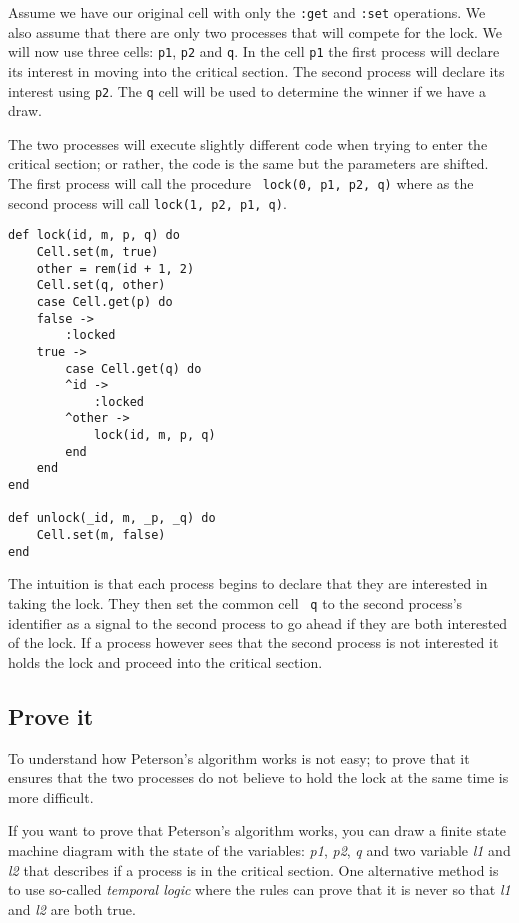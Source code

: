 \documentclass[a4paper,11pt]{article}
\begin{document}
Assume we have our original cell with only the {\tt :get} and {\tt :set}
operations. We also assume that there are only two processes that will
compete for the lock. We will now use three cells: {\tt p1}, {\tt p2}
and {\tt q}. In the cell {\tt p1} the first process will declare its
interest in moving into the critical section. The second process will
declare its interest using {\tt p2}. The {\tt q} cell will be used to
determine the winner if we have a draw.

The two processes will execute slightly different code when trying to
enter the critical section; or rather, the code is the same but the
parameters are shifted. The first process will call the procedure {\tt
    lock(0, p1, p2, q)} where as the second process will call {\tt lock(1, p2, p1, q)}.

\pagebreak

\begin{verbatim}
def lock(id, m, p, q) do
    Cell.set(m, true)
    other = rem(id + 1, 2)
    Cell.set(q, other)
    case Cell.get(p) do
    false ->
        :locked
    true -> 
        case Cell.get(q) do
        ^id ->
            :locked
        ^other ->
            lock(id, m, p, q)            
        end
    end
end

def unlock(_id, m, _p, _q) do
    Cell.set(m, false)
end
\end{verbatim}

The intuition is that each process begins to declare that they are
interested in taking the lock. They then set the common cell {\tt
    q} to the second process's identifier as a signal to the second
process to go ahead if they are both interested of the lock. If a
process however sees that the second process is not interested it
holds the lock and proceed into the critical section.


\subsection{Prove it}

To understand how Peterson's algorithm works is not easy; to prove
that it ensures that the two processes do not believe to hold the
lock at the same time is more difficult. 
    
If you want to prove that Peterson's algorithm works, you can draw a
finite state machine diagram with the state of the variables: {\em
    p1}, {\em p2}, {\em q} and two variable {\em l1} and {\em l2} that
describes if a process is in the critical section. One alternative
method is to use so-called {\em temporal logic} where the rules can
prove that it is never so that {\em l1} and {\em l2} are both true.
\end{document}
